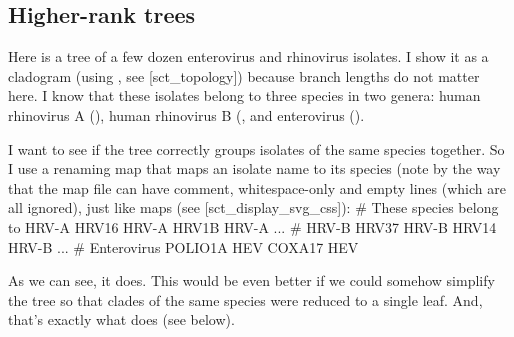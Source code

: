 
\subsection[sct_higher_rank]{Higher-rank trees}


Here is a tree of a few dozen enterovirus and rhinovirus isolates. I show it as
a cladogram (using \topology, see \in{}[sct_topology]) because branch lengths do
not matter here. I know that these isolates belong to three species in two
genera: human rhinovirus A (), human rhinovirus B
(, and enterovirus (). 


\noindent{}I want to see if the tree correctly groups isolates of the same
species together. So I use a renaming map that maps an isolate name to its
species (note by the way that the map file can have comment, whitespace-only
and empty lines (which are all ignored), just like  maps (see
\in{}[sct_display_svg_css]):
\starttyping
# These species belong to HRV-A
HRV16 HRV-A
HRV1B HRV-A
...
# HRV-B
HRV37 HRV-B
HRV14 HRV-B
...
# Enterovirus
POLIO1A HEV
COXA17 HEV
\stoptyping


\noindent{}As we can see, it does. This would be even better if we could
somehow simplify the tree so that clades of the same species were reduced to a
single leaf. And, that's exactly what \condense{} does (see below).

